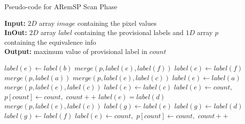 \begin{algorithm}[ht!]
\small
{
	\caption{Pseudo-code for ARemSP Scan Phase}
	\label{alg:ARemSP-I}
	\textbf{Input:} $2D$ array $image$ containing the pixel values \\
	\textbf{InOut:} $2D$ array $label$ containing the provisional labels and $1D$ array $p$ containing the equivalence info\\
	\textbf{Output:} maximum value of
	provisional label in $count$
	\begin{algorithmic}[1]
							\State $label(e) \gets label(b)$
								\State $merge(p,label(e),label(f))$ 
							\EndIf
						\Else
								\State $label(e) \gets label(f)$
									\State $merge(p,label(a))$
								\EndIf
									\State $merge(p,label(e),label(c))$
								\EndIf
							\Else
									\State $label(e) \gets label(a)$
										\State $merge(p,label(e),label(c))$
									\EndIf
								\Else
										\State $label(e) \gets label(c)$
									\Else
										\State $label(e) \gets count,$
										\State $p[count] \gets count,$
										\State $count++$
									\EndIf
								\EndIf
							\EndIf
						\EndIf
					\Else
						\State $label(e) = label(d)$
								\State $merge(p,label(e),label(c))$
							\EndIf
						\EndIf
					\EndIf
						\State $label(g) \gets label(e)$
					\EndIf
				\Else
							\State $label(g) \gets label(d)$
						\Else
								\State $label(g) \gets label(f)$
							\Else
								\State $label(e) \gets count,$
								\State $p[count] \gets count,$
								\State $count++$
							\EndIf
						\EndIf
					\EndIf
				\EndIf
			\EndFor
		\EndFor
		\State {}
	\EndFunction
	\end{algorithmic}	
}
\end{algorithm}

